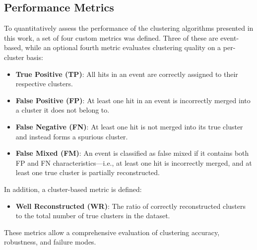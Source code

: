 \documentclass[final,5p,times,twocolumn]{elsarticle}
\begin{document}
\subsection{Performance Metrics}\label{s_sec:metrics}
To quantitatively assess the performance of the clustering algorithms presented in this work, a set of four custom metrics was defined. Three of these are event-based, while an optional fourth metric evaluates clustering quality on a per-cluster basis:
\begin{itemize}
    \item \textbf{True Positive (TP)}: All hits in an event are correctly assigned to their respective clusters.
    \item \textbf{False Positive (FP)}: At least one hit in an event is incorrectly merged into a cluster it does not belong to.
    \item \textbf{False Negative (FN)}: At least one hit is not merged into its true cluster and instead forms a spurious cluster.
    \item \textbf{False Mixed (FM)}: An event is classified as false mixed if it contains both FP and FN characteristics—i.e., at least one hit is incorrectly merged, and at least one true cluster is partially reconstructed.
\end{itemize}
In addition, a cluster-based metric is defined:
\begin{itemize}
    \item \textbf{Well Reconstructed (WR)}: The ratio of correctly reconstructed clusters to the total number of true clusters in the dataset.
\end{itemize}
These metrics allow a comprehensive evaluation of clustering accuracy, robustness, and failure modes.
\end{document}
